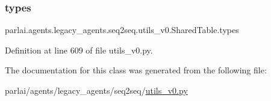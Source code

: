 \subsubsection{\texorpdfstring{types}{types}}
{\footnotesize\ttfamily parlai.\+agents.\+legacy\+\_\+agents.\+seq2seq.\+utils\+\_\+v0.\+Shared\+Table.\+types\hspace{0.3cm}{\ttfamily [static]}}



Definition at line 609 of file utils\+\_\+v0.\+py.



The documentation for this class was generated from the following file\+:\begin{DoxyCompactItemize}
\item 
parlai/agents/legacy\+\_\+agents/seq2seq/\hyperlink{utils__v0_8py}{utils\+\_\+v0.\+py}\end{DoxyCompactItemize}

